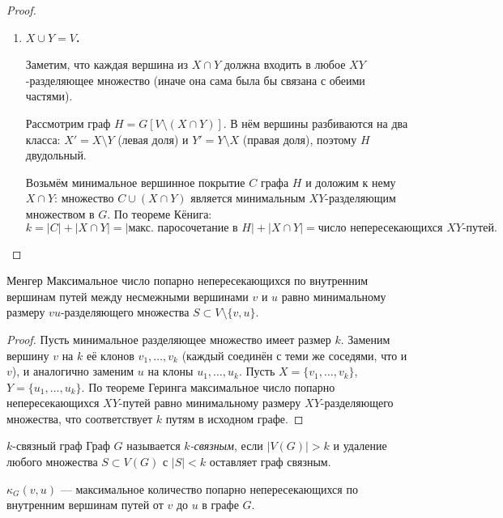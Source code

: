 \begin{proof}
\begin{enumerate}
\begin{enumerate}
			\item \textbf{$X \cup Y = V$.}
			
			Заметим, что каждая вершина из $X \cap Y$ должна входить
			в любое $XY$-разделяющее множество (иначе она сама
			была бы связана с обеими частями).
			
			Рассмотрим граф $H = G[V \setminus (X \cap Y)]$.
			В нём вершины разбиваются на два класса:
			$X' = X \setminus Y$ (левая доля) и
			$Y' = Y \setminus X$ (правая доля),
			поэтому $H$ двудольный.
			
			Возьмём минимальное вершинное покрытие $C$ графа $H$
			и доложим к нему $X \cap Y$: множество $C \cup (X \cap Y)$
			является минимальным $XY$-разделяющим множеством в $G$.
			По теореме Кёнига:
			\[
			k
			= \bigl|C\bigr| + \bigl|X \cap Y\bigr|
			= \bigl|\text{макс. паросочетание в } H\bigr|
			+ \bigl|X \cap Y\bigr|
			= \text{число непересекающихся } XY\text{-путей.}
			\]
		\end{enumerate}
	\end{enumerate}
\end{proof}

\begin{Theorem}{Менгер}{}
	Максимальное число попарно непересекающихся по внутренним
	вершинам путей между несмежными вершинами $v$ и $u$ равно
	минимальному размеру $vu$-разделяющего множества
	$S \subset V \setminus \{v, u\}$.
\end{Theorem}
\begin{proof}
	Пусть минимальное разделяющее множество имеет размер $k$.
	Заменим вершину $v$ на $k$ её клонов $v_1, \ldots, v_k$
	(каждый соединён с теми же соседями, что и $v$),
	и аналогично заменим $u$ на клоны $u_1, \ldots, u_k$.
	Пусть $X = \{v_1,\ldots,v_k\}$, $Y = \{u_1,\ldots,u_k\}$.
	По теореме Геринга максимальное число попарно непересекающихся
	$XY$-путей равно минимальному размеру $XY$-разделяющего
	множества, что соответствует $k$ путям в исходном графе.
\end{proof}

\begin{Definition}{$k$-связный граф}{}
	Граф $G$ называется \emph{$k$-связным}, если
	$|V(G)| > k$ и удаление любого множества $S \subset V(G)$
	с $|S| < k$ оставляет граф связным.
\end{Definition}

\begin{Definition}{}{}
	$\kappa_G(v, u)$ --- максимальное количество попарно
	непересекающихся по внутренним вершинам путей от $v$ до $u$
	в графе $G$.
\end{Definition}

